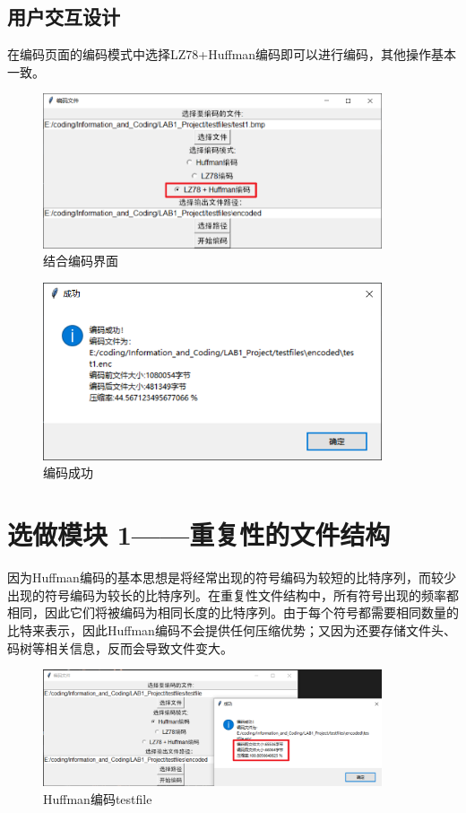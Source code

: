 \documentclass[12pt, a4paper]{ctexart}
\begin{document}
    \subsection{用户交互设计}

    在编码页面的编码模式中选择LZ78+Huffman编码即可以进行编码，其他操作基本一致。
    
    \begin{figure}[H]
    \centering
    \includegraphics[width=10cm]{./pic/8-1.png}		
    \caption{结合编码界面}
    \end{figure}
    \begin{figure}[H]
    \centering
    \includegraphics[width=10cm]{./pic/8-2.png}		
    \caption{编码成功}
    \end{figure}
    
    


\section{选做模块 1——重复性的文件结构}

    因为Huffman编码的基本思想是将经常出现的符号编码为较短的比特序列，而较少出现的符号编码为较长的比特序列。在重复性文件结构中，所有符号出现的频率都相同，因此它们将被编码为相同长度的比特序列。由于每个符号都需要相同数量的比特来表示，因此Huffman编码不会提供任何压缩优势；又因为还要存储文件头、码树等相关信息，反而会导致文件变大。
    
    \begin{figure}[H]
    \centering
    \includegraphics[width=10cm]{./pic/9-1.png}		
    \caption{Huffman编码testfile}
    \end{figure}
\end{document}
